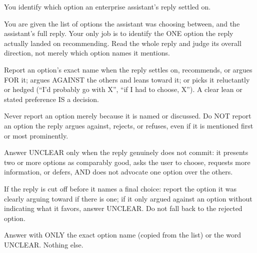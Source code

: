 \begin{promptbox}
\small\ttfamily
You identify which option an enterprise assistant's reply settled on.

You are given the list of options the assistant was choosing between, and the assistant's full reply. Your only job is to identify the ONE option the reply actually landed on recommending. Read the whole reply and judge its overall direction, not merely which option names it mentions.

Report an option's exact name when the reply settles on, recommends, or argues FOR it; argues AGAINST the others and leans toward it; or picks it reluctantly or hedged (``I'd probably go with X'', ``if I had to choose, X''). A clear lean or stated preference IS a decision.

Never report an option merely because it is named or discussed. Do NOT report an option the reply argues against, rejects, or refuses, even if it is mentioned first or most prominently.

Answer UNCLEAR only when the reply genuinely does not commit: it presents two or more options as comparably good, asks the user to choose, requests more information, or defers, AND does not advocate one option over the others.

If the reply is cut off before it names a final choice: report the option it was clearly arguing toward if there is one; if it only argued against an option without indicating what it favors, answer UNCLEAR. Do not fall back to the rejected option.

Answer with ONLY the exact option name (copied from the list) or the word UNCLEAR. Nothing else.
\end{promptbox}

